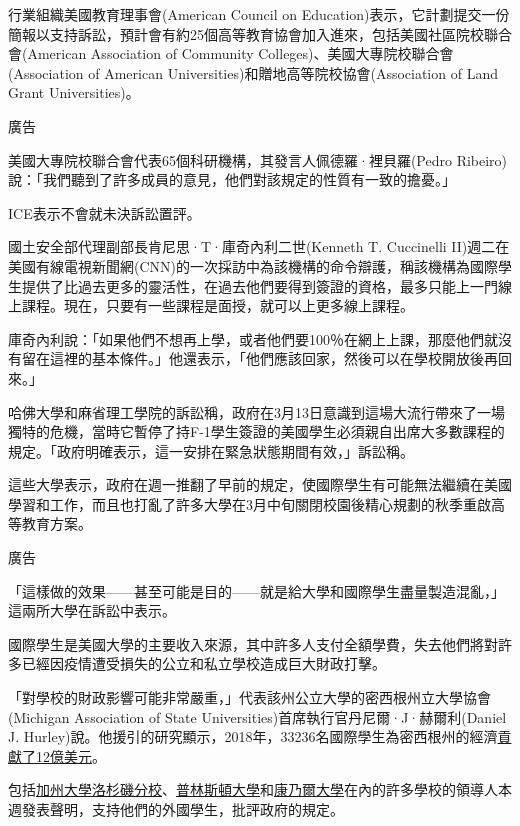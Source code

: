 行業組織美國教育理事會(American Council on
Education)表示，它計劃提交一份簡報以支持訴訟，預計會有約25個高等教育協會加入進來，包括美國社區院校聯合會(American
Association of Community Colleges)、美國大專院校聯合會(Association of
American Universities)和贈地高等院校協會(Association of Land Grant
Universities)。

廣告

美國大專院校聯合會代表65個科研機構，其發言人佩德羅·裡貝羅(Pedro
Ribeiro)說：「我們聽到了許多成員的意見，他們對該規定的性質有一致的擔憂。」

ICE表示不會就未決訴訟置評。

國土安全部代理副部長肯尼思·T·庫奇內利二世(Kenneth T. Cuccinelli
II)週二在美國有線電視新聞網(CNN)的一次採訪中為該機構的命令辯護，稱該機構為國際學生提供了比過去更多的靈活性，在過去他們要得到簽證的資格，最多只能上一門線上課程。現在，只要有一些課程是面授，就可以上更多線上課程。

庫奇內利說：「如果他們不想再上學，或者他們要100％在網上上課，那麼他們就沒有留在這裡的基本條件。」他還表示，「他們應該回家，然後可以在學校開放後再回來。」

哈佛大學和麻省理工學院的訴訟稱，政府在3月13日意識到這場大流行帶來了一場獨特的危機，當時它暫停了持F-1學生簽證的美國學生必須親自出席大多數課程的規定。「政府明確表示，這一安排在緊急狀態期間有效，」訴訟稱。

這些大學表示，政府在週一推翻了早前的規定，使國際學生有可能無法繼續在美國學習和工作，而且也打亂了許多大學在3月中旬關閉校園後精心規劃的秋季重啟高等教育方案。

廣告

「這樣做的效果------甚至可能是目的------就是給大學和國際學生盡量製造混亂，」這兩所大學在訴訟中表示。

國際學生是美國大學的主要收入來源，其中許多人支付全額學費，失去他們將對許多已經因疫情遭受損失的公立和私立學校造成巨大財政打擊。

「對學校的財政影響可能非常嚴重，」代表該州公立大學的密西根州立大學協會(Michigan
Association of State Universities)首席執行官丹尼爾·J·赫爾利(Daniel J.
Hurley)說。他援引的研究顯示，2018年，33236名國際學生為密西根州的經濟\href{https://www.nafsa.org/isev/reports/state?year=2018\&state=MI}{貢獻了12億美元}。

包括\href{https://chancellor.ucla.edu/messages/standing-international-students/}{加州大學洛杉磯分校}、\href{https://www.princeton.edu/news/2020/07/08/president-eisgruber-princeton-stands-firmly-international-students-face-ice}{普林斯頓大學}和\href{https://news.cornell.edu/stories/2020/07/pollack-sends-message-support-international-students}{康乃爾大學}在內的許多學校的領導人本週發表聲明，支持他們的外國學生，批評政府的規定。

